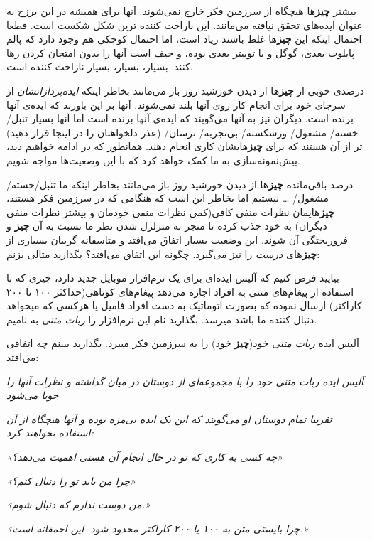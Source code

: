 بیشتر \textbf{چیز}ها هیچگاه از سرزمین فکر خارج نمی‌شوند. آنها برای همیشه
در این برزخ به عنوان ایده‌های تحقق نیافته می‌مانند. این ناراحت کننده
ترین شکل شکست است. قطعا احتمال اینکه این \textbf{چیز}ها غلط باشند زیاد
است، اما احتمال کوچکی هم وجود دارد که پالم پایلوت بعدی، گوگل و یا توییتر
بعدی بوده، و حیف است آنها را بدون امتحان کردن رها کنند. بسیار، بسیار،
بسیار ناراحت کننده است.

درصدی خوبی از \textbf{چیز}ها از دیدن خورشید روز باز می‌مانند بخاطر اینکه
\emph{ایده‌پردازانشان} از سرجای خود برای انجام کار روی آنها بلند
نمی‌شوند. آنها بر این باورند که ایده‌ی آنها برنده است. دیگران نیز به
آنها می‌گویند که ایده‌ی آنها برنده است اما آنها بسیار تنبل/ خسته/ مشغول/
ورشکسته/ بی‌تجربه/ ترسان/ (عذر دلخواهتان را در اینجا قرار دهید) تر از آن
هستند که برای \textbf{چیز}هایشان کاری انجام دهند. همانطور که در ادامه
خواهیم دید، پیش‌نمونه‌سازی به ما کمک خواهد کرد که با این وضعیت‌ها مواجه
شویم.

درصد باقی‌مانده \textbf{چیز}ها از دیدن خورشید روز باز می‌مانند بخاطر
اینکه ما تنبل/خسته/مشغول/ \ldots{} نیستیم اما بخاطر این است که هنگامی که
در سرزمین فکر هستند، \textbf{چیز}هایمان نظرات منفی کافی(کمی نظرات منفی
خودمان و بیشتر نظرات منفی دیگران) به خود جذب کرده تا منجر به متزلزل شدن
نظر ما نسبت به آن \textbf{چیز} و فروریختگی آن شوند. این وضعیت بسیار
اتفاق می‌افتد و متاسفانه گریبان بسیاری از \textbf{چیز}های \emph{درست} را
نیز می‌گیرد. چگونه این اتفاق می‌افتد؟ بگذارید مثالی بزنم:

بیایید فرض کنیم که آلیس ایده‌ای برای یک نرم‌افزار موبایل جدید دارد، چیزی
که با استفاده از پیغام‌های متنی به افراد اجازه می‌دهد پیغام‌های
کوتاهی(حداکثر ۱۰۰ تا ۲۰۰ کاراکتر) ارسال نموده که بصورت اتوماتیک به دست
افراد فامیل یا هرکسی که میخواهد دنبال کننده ما باشد میرسد. بگذارید نام
این نرم‌افزار را \emph{ربات متنی} به نامیم.

آلیس ایده \emph{ربات متنی} خود(\textbf{چیز} خود) را به سرزمین فکر‌
میبرد. بگذارید ببینم چه اتفاقی می‌افتد:

‍\emph{آلیس ایده ربات متنی خود را با مجموعه‌ای از دوستان در میان گذاشته
و نظرات آنها را جویا می‌شود}

\emph{تقریبا تمام دوستان او می‌گویند که این یک ایده بی‌مزه بوده و آنها
هیچگاه از آن استفاده نخواهند کرد:}

\emph{«چه کسی به کاری که تو در حال انجام آن هستی اهمیت می‌دهد؟»}

\emph{«چرا من باید تو را دنبال کنم؟»}

\emph{«من دوست ندارم که دنبال شوم.»}

\emph{«چرا بایستی متن به ۱۰۰ یا ۲۰۰ کاراکتر محدود شود. این احمقانه
است.»}

